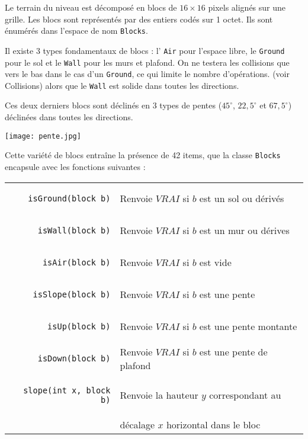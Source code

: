 \documentclass[a4paper,11pt]{article}
\begin{document}
Le terrain du niveau est décomposé en blocs de $16 \times 16$ pixels alignés sur une grille. Les blocs sont représentés par des entiers codés sur 1 octet. Ils sont énumérés dans l'espace de nom \texttt{Blocks}.

Il existe 3 types fondamentaux de blocs : l' \texttt{Air} pour l'espace libre, le \texttt{Ground} pour le sol et le \texttt{Wall} pour les murs et plafond. On ne testera les collisions que vers le bas dans le cas d'un \texttt{Ground}, ce qui limite le nombre d'opérations. (voir Collisions) alors que le \texttt{Wall} est solide dans toutes les directions.

Ces deux derniers blocs sont déclinés en 3 types de pentes ($45^\circ$, $22,5^\circ$ et $67,5^\circ$) déclinées dans toutes les directions.

\begin{center}
\texttt{[image: pente.jpg]}
\end{center}

Cette variété de blocs entraîne la présence de 42 items, que la classe \texttt{Blocks} encapsule avec les fonctions suivantes :
\vspace{0.3cm}

\renewcommand{\arraystretch}{1.3}
\begin{tabular}{r | l}
\begin{lstlisting}
isGround(block b)
\end{lstlisting}
& Renvoie $VRAI$ si $b$ est un sol ou dérivés \\
\begin{lstlisting}
isWall(block b)
\end{lstlisting}
& Renvoie $VRAI$ si $b$ est un mur ou dérives \\
\begin{lstlisting}
isAir(block b)
\end{lstlisting}
& Renvoie $VRAI$ si $b$ est vide \\
\begin{lstlisting}
isSlope(block b)
\end{lstlisting}
& Renvoie $VRAI$ si $b$ est une pente \\
\begin{lstlisting}
isUp(block b)
\end{lstlisting}
& Renvoie $VRAI$ si $b$ est une pente montante \\
\begin{lstlisting}
isDown(block b)
\end{lstlisting}
& Renvoie $VRAI$ si $b$ est une pente de plafond \\
\begin{lstlisting}
slope(int x, block b)
\end{lstlisting}
& Renvoie la hauteur $y$ correspondant au \\
& décalage $x$ horizontal dans le bloc

\end{tabular}
\end{document}
